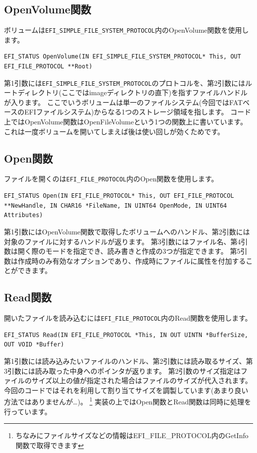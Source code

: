 \documentclass[10pt,b5paper,twoside,openany]{ltjsbook}
\begin{document}
\subsection{OpenVolume関数}
ボリュームは\verb+EFI_SIMPLE_FILE_SYSTEM_PROTOCOL+内のOpenVolume関数を使用します。
\begin{lstlisting}[style=customC]
EFI_STATUS OpenVolume(IN EFI_SIMPLE_FILE_SYSTEM_PROTOCOL* This, OUT EFI_FILE_PROTOCOL **Root)
\end{lstlisting}
第1引数には\verb+EFI_SIMPLE_FILE_SYSTEM_PROTOCOL+のプロトコルを、第2引数にはルートディレクトリ(ここではimageディレクトリの直下)を指すファイルハンドルが入ります。
ここでいうボリュームは単一のファイルシステム(今回ではFATベースのEFIファイルシステム)からなる1つのストレージ領域を指します。
コード上ではOpenVolume関数はOpenFileVolumeという1つの関数上に書いています。
これは一度ボリュームを開いてしまえば後は使い回しが効くためです。

\subsection{Open関数}
ファイルを開くのは\verb+EFI_FILE_PROTOCOL+内のOpen関数を使用します。
\begin{lstlisting}[style=customC]
EFI_STATUS Open(IN EFI_FILE_PROTOCOL* This, OUT EFI_FILE_PROTOCOL **NewHandle, IN CHAR16 *FileName, IN UINT64 OpenMode, IN UINT64 Attributes)
\end{lstlisting}
第1引数にはOpenVolume関数で取得したボリュームへのハンドル、第2引数には対象のファイルに対するハンドルが返ります。
第3引数にはファイル名、第4引数は開く際のモードを指定でき、読み書きと作成の3つが指定できます。
第5引数は作成時のみ有効なオプションであり、作成時にファイルに属性を付加することができます。

\subsection{Read関数}
開いたファイルを読み込むには\verb+EFI_FILE_PROTOCOL+内のRead関数を使用します。
\begin{lstlisting}[style=customC]
    EFI_STATUS Read(IN EFI_FILE_PROTOCOL *This, IN OUT UINTN *BufferSize, OUT VOID *Buffer)
\end{lstlisting}
第1引数には読み込みたいファイルのハンドル、第2引数には読み取るサイズ、第3引数には読み取った中身へのポインタが返ります。
第2引数のサイズ指定はファイルのサイズ以上の値が指定された場合はファイルのサイズが代入されます。
今回のコードではそれを利用して割り当てサイズを調製しています(あまり良い方法ではありませんが…)。
\footnote{ちなみにファイルサイズなどの情報はEFI\_FILE\_PROTOCOL内のGetInfo関数で取得できます}
実装の上ではOpen関数とRead関数は同時に処理を行っています。
\end{document}
